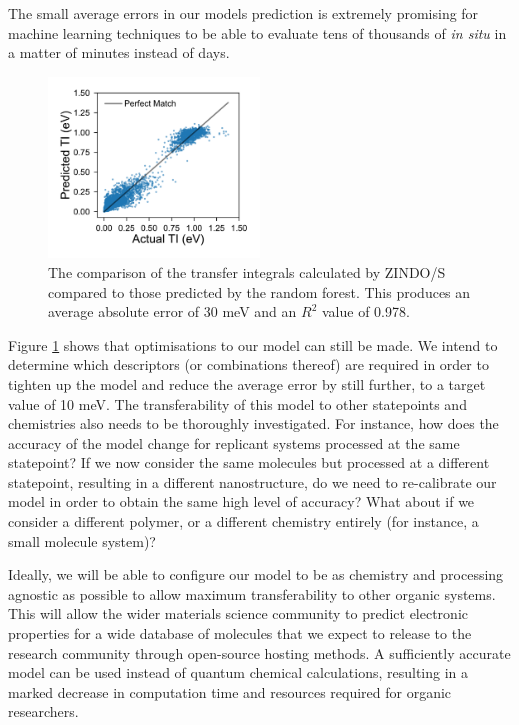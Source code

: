\documentclass[12pt]{article}
\begin{document}
The small average errors in our models prediction is extremely promising for machine learning techniques to be able to evaluate tens of thousands of \textit{in situ} in a matter of minutes instead of days.
\begin{figure}\centering
	\includegraphics[width=0.5\textwidth]{Figures/comparison.pdf}
    \caption{
The comparison of the transfer integrals calculated by ZINDO/S compared to those predicted by the random forest.
This produces an average absolute error of 30 meV and an $R^2$ value of 0.978.
}
	\label{fig:random_forest_results}
\end{figure}
Figure \ref{fig:random_forest_results} shows that optimisations to our model can still be made.
We intend to determine which descriptors (or combinations thereof) are required in order to tighten up the model and reduce the average error by still further, to a target value of 10 meV.
The transferability of this model to other statepoints and chemistries also needs to be thoroughly investigated.
For instance, how does the accuracy of the model change for replicant systems processed at the same statepoint?
If we now consider the same molecules but processed at a different statepoint, resulting in a different nanostructure, do we need to re-calibrate our model in order to obtain the same high level of accuracy?
What about if we consider a different polymer, or a different chemistry entirely (for instance, a small molecule system)?


Ideally, we will be able to configure our model to be as chemistry and processing agnostic as possible to allow maximum transferability to other organic systems.
This will allow the wider materials science community to predict electronic properties for a wide database of molecules that we expect to release to the research community through open-source hosting methods.
A sufficiently accurate model can be used instead of quantum chemical calculations, resulting in a marked decrease in computation time and resources required for organic researchers.
\end{document}
